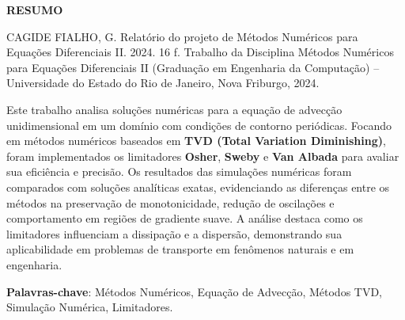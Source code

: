 \begin{titlepage}
    \thispagestyle{empty} %

    \begin{center}
        \textbf{\Large RESUMO}
    \end{center}

    \vspace{1cm} %

    \noindent CAGIDE FIALHO, G. Relatório do projeto de Métodos Numéricos para Equações Diferenciais II. 2024. 16 f. Trabalho da Disciplina Métodos Numéricos para Equações Diferenciais II (Graduação em Engenharia da Computação) – Universidade do Estado do Rio de Janeiro, Nova Friburgo, 2024.

    \vspace{0.4cm} %

    Este trabalho analisa soluções numéricas para a equação de advecção unidimensional em um domínio com condições de contorno periódicas. Focando em métodos numéricos baseados em \textbf{TVD (Total Variation Diminishing)}, foram implementados os limitadores \textbf{Osher}, \textbf{Sweby} e \textbf{Van Albada} para avaliar sua eficiência e precisão. Os resultados das simulações numéricas foram comparados com soluções analíticas exatas, evidenciando as diferenças entre os métodos na preservação de monotonicidade, redução de oscilações e comportamento em regiões de gradiente suave. A análise destaca como os limitadores influenciam a dissipação e a dispersão, demonstrando sua aplicabilidade em problemas de transporte em fenômenos naturais e em engenharia.

    \vspace{0.4cm} %

    \textbf{Palavras-chave}: Métodos Numéricos, Equação de Advecção, Métodos TVD, Simulação Numérica, Limitadores.
\end{titlepage}

